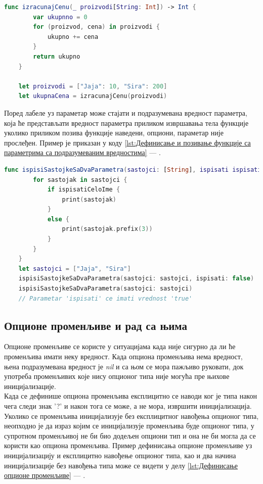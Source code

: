\documentclass[12pt,oneside]{memoir}
\begin{document}
\begin{lstlisting}[caption=\textit{{Дефинисање и позивање функције са повратном вредношћу}}, label={lst:Дефинисање и позивање функције са повратном вредношћу}, language=Swift, frame=single]
    func izracunajCenu(_ proizvodi[String: Int]) -> Int {
        var ukupnno = 0
        for (proizvod, cena) in proizvodi {
            ukupno += cena
        }
        return ukupno
    }
    
    let proizvodi = ["Jaja": 10, "Sira": 200]
    let ukupnaCena = izracunajCenu(proizvodi)
\end{lstlisting}
    
\indent Поред лабеле уз параметар може стајати и подразумевана вредност параметра, која ће представљати вредност параметра приликом извршавања тела функције уколико приликом позива функције наведени, опциони, параметар није прослеђен. Пример је приказан у коду \ref{lst:Дефинисање и позивање функције са параметрима са подразумеваним вредностима} --- .
    
\begin{lstlisting}[caption=\textit{{Дефинисање и позивање функције са параметрима са подразумеваним вредностима}}, label={lst:Дефинисање и позивање функције са параметрима са подразумеваним вредностима}, language=Swift, frame=single]
    func ispisiSastojkeSaDvaParametra(sastojci: [String], ispisati ispisatiCeloIme: Bool = true) {
        for sastojak in sastojci {
            if ispisatiCeloIme {
                print(sastojak)
            }
            else {
                print(sastojak.prefix(3))
            }
        }
    }
    let sastojci = ["Jaja", "Sira"]
    ispisiSastojkeSaDvaParametra(sastojci: sastojci, ispisati: false)
    ispisiSastojkeSaDvaParametra(sastojci: sastojci)
    // Parametar 'ispisati' ce imati vrednost 'true'
\end{lstlisting}

\subsection{Опционе променљиве и рад са њима}

\indent Опционе променљиве се користе у ситуацијама када није сигурно да ли ће променљива имати неку вредност. Када опциона променљива нема вредност, њена подразумевана вредност је \textit{nil} и са њом се мора пажљиво руковати, док употреба променљивих које нису опционог типа није могућа пре њихове иницијализације.
\\
\indent Када се дефинише опциона променљива експлицитно се наводи ког је типа након чега следи знак '?' и након тога се може, а не мора, извршити иницијализација. Уколико се променљива иницијализује без експлицитног навођења опционог типа, неопходно је да израз којим се иницијализује променљива буде опционог типа, у супротном променљивој не би био додељен опциони тип и она не би могла да се користи као опциона променљива. Пример дефинисања опционе променљиве уз иницијализацију и експлицитно навођење опционог типа, као и два начина иницијализације без навођења типа може се видети у делу \ref{lst:Дефинисање опционе променљиве} --- .
\end{document}
